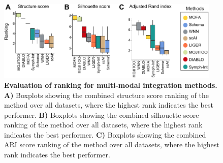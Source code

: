 \begin{figure}[!ht]
	\centering
	\includegraphics[width=0.95\textwidth]{ranking/fig}
	\vspace{0.1cm}
	\caption[Evaluation of ranking for multi-modal integration methods.]{\textbf{Evaluation of ranking for multi-modal integration methods.} \textbf{A)} Boxplots showing the combined structure score ranking of the method over all datasets, where the highest rank indicates the best performer. \textbf{B)} Boxplots showing the combined silhouette score ranking of the method over all datasets, where the highest rank indicates the best performer. \textbf{C)} Boxplots showing the combined ARI score ranking of the method over all datasets, where the highest rank indicates the best performer.}
	\label{fig:ranking}
\end{figure}


